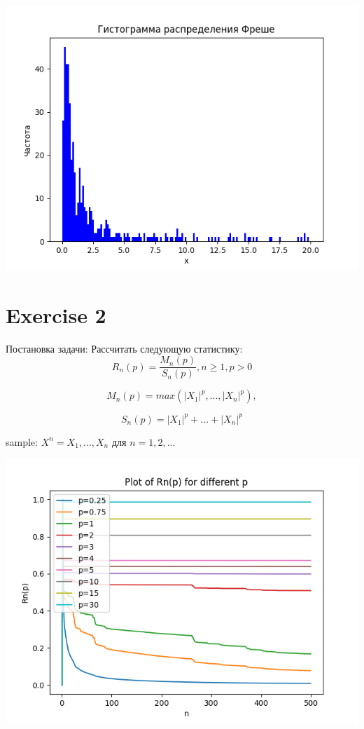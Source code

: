 \documentclass[reprint, amsmath, amssymb, aps,]{revtex4-2}
\begin{document}
\begin{center}
\centering 
\includegraphics[scale=0.6]{Exercise1.png}
\end{center}

\section{Exercise 2}
Постановка задачи:
Рассчитать следующую статистику:
\begin{equation} \label{Ex 2}
R_{n}(p) = \frac{M_{n}(p)}{S_{n}(p)}, n\geq 1, p > 0
\end{equation}

\begin{equation} \label{Ex 2.1}
M_{n}(p) = max(|X_{1}|^{p}, ..., |X_{n}|^{p}),
\end{equation}

\begin{equation} \label{Ex 2.2}
S_{n}(p) = |X_{1}|^{p}+...+|X_{n}|^{p}
\end{equation}

sample: $X^{n}=X_{1}, ..., X_{n}$ для $n=1, 2,...$


\begin{center}
\centering 
\includegraphics[scale=0.6]{Exercise2.png}
\end{center}
\end{document}

